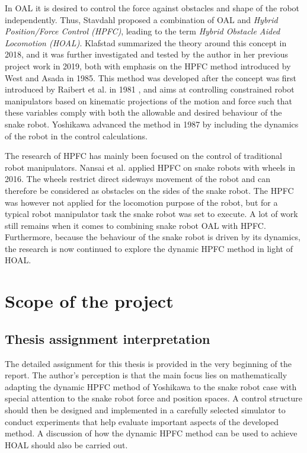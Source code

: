 
In OAL it is desired to control the force against obstacles and shape of the robot independently. Thus, Stavdahl \cite{StavdahlNote} proposed a combination of OAL and \textit{Hybrid Position/Force Control (HPFC)}, leading to the term \textit{Hybrid Obstacle Aided Locomotion (HOAL)}. Klafstad \cite{TorjusOppg} summarized the theory around this concept in 2018, and it was further investigated and tested by the author in her previous project work \cite{AtussaProsjektoppgp} in 2019, both with emphasis on the HPFC method introduced by West and Asada \cite{west1985method} in 1985. This method was developed after the concept was first introduced by Raibert et al. in 1981 \cite{raibert1981hybrid}, and aims at controlling constrained robot manipulators based on kinematic projections of the motion and force such that these variables comply with both the allowable and desired behaviour of the snake robot. Yoshikawa \cite{yoshikawa1987dynamic} advanced the method in 1987 by including the dynamics of the robot in the control calculations.

The research of HPFC has mainly been focused on the control of traditional robot manipulators. Nansai et al. \cite{nansai2016dynamic} applied HPFC on snake robots with wheels in 2016. The wheels restrict direct sideways movement of the robot and can therefore be considered as obstacles on the sides of the snake robot. The HPFC was however not applied for the locomotion purpose of the robot, but for a typical robot manipulator task the snake robot was set to execute. A lot of work still remains when it comes to combining snake robot OAL with HPFC. Furthermore, because the behaviour of the snake robot is driven by its dynamics, the research is now continued to explore the dynamic HPFC method in light of HOAL.



\section{Scope of the project}

\subsection{Thesis assignment interpretation}

The detailed assignment for this thesis is provided in the very beginning of the report. The author's perception is that the main focus lies on mathematically adapting the dynamic HPFC method of Yoshikawa \cite{yoshikawa1987dynamic} to the snake robot case with special attention to the snake robot force and position spaces. A control structure should then be designed and implemented in a carefully selected simulator to conduct experiments that help evaluate important aspects of the developed method. A discussion of how the dynamic HPFC method can be used to achieve HOAL should also be carried out.

